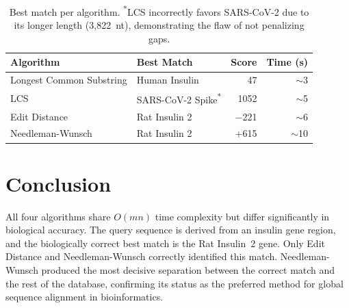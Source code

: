 \documentclass{article}
\begin{document}
\begin{table}[h]
\centering
\begin{tabular}{@{}llrr@{}}
\toprule
\textbf{Algorithm} & \textbf{Best Match} & \textbf{Score} & \textbf{Time (s)} \\
\midrule
Longest Common Substring & Human Insulin & 47 & $\sim$3 \\
LCS & SARS-CoV-2 Spike\textsuperscript{*} & 1052 & $\sim$5 \\
Edit Distance & Rat Insulin 2 & $-$221 & $\sim$6 \\
Needleman-Wunsch & Rat Insulin 2 & $+$615 & $\sim$10 \\
\bottomrule
\end{tabular}
\caption{Best match per algorithm. \textsuperscript{*}LCS incorrectly favors SARS-CoV-2 due to its longer length (3,822~nt), demonstrating the flaw of not penalizing gaps.}
\end{table}

\section{Conclusion}

All four algorithms share $O(mn)$ time complexity but differ significantly in biological accuracy. The query sequence is derived from an insulin gene region, and the biologically correct best match is the Rat Insulin~2 gene. Only Edit Distance and Needleman-Wunsch correctly identified this match. Needleman-Wunsch produced the most decisive separation between the correct match and the rest of the database, confirming its status as the preferred method for global sequence alignment in bioinformatics.
\end{document}
